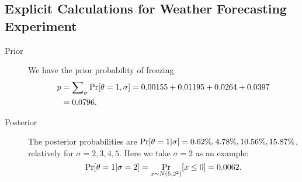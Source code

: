 \documentclass{article}
\begin{document}
\subsection{Explicit Calculations for Weather Forecasting Experiment}


\begin{description}
    \item[Prior] We have the prior probability of freezing 
\begin{align*}
    p &= \sum\nolimits_\sigma \Pr[\theta = 1 , \sigma]=0.00155+0.01195+0.0264+0.0397\\
    &=0.0796.
\end{align*}

\item [Posterior] The posterior probabilities are $\Pr[\theta=1|\sigma]=0.62\%, 4.78\%, 10.56\%, 15.87\%$, relatively for $\sigma=2, 3, 4, 5$. Here we take $\sigma = 2$ as an example:
\begin{equation*}
    \Pr[\theta=1 | \sigma = 2] = \Pr_{ x\sim N(5, 2^2)}[x\leq 0]=0.0062.
\end{equation*}

\end{description}
\end{document}

